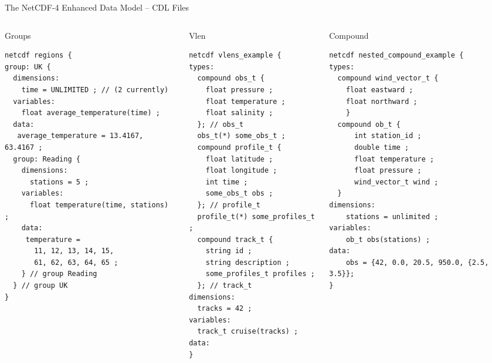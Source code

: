 \documentclass[compress,11pt,xcolor=svgnames,aspectratio=169]{beamer}
\begin{document}
\begin{frame}[fragile]{The NetCDF-4 Enhanced Data Model -- CDL Files}

\begin{columns}

\begin{column}{0.35\textwidth}
\begin{block}{Groups}
\vspace*{-0.4cm}
{ \tiny
\begin{verbatim}
netcdf regions {
group: UK {
  dimensions:
    time = UNLIMITED ; // (2 currently)
  variables:
    float average_temperature(time) ;
  data:
   average_temperature = 13.4167, 63.4167 ;
  group: Reading {
    dimensions:
      stations = 5 ;
    variables:
      float temperature(time, stations) ;
    data:
     temperature =
       11, 12, 13, 14, 15,
       61, 62, 63, 64, 65 ;
    } // group Reading
  } // group UK
}
\end{verbatim}
}
\vspace*{-0.4cm}
\end{block}
\end{column}

\begin{column}{0.25\textwidth}
\begin{block}{Vlen}
\vspace*{-0.4cm}
{ \tiny
\begin{verbatim}
netcdf vlens_example {
types:
  compound obs_t {
    float pressure ;
    float temperature ;
    float salinity ;
  }; // obs_t
  obs_t(*) some_obs_t ;
  compound profile_t {
    float latitude ;
    float longitude ;
    int time ;
    some_obs_t obs ;
  }; // profile_t
  profile_t(*) some_profiles_t ;
  compound track_t {
    string id ;
    string description ;
    some_profiles_t profiles ;
  }; // track_t
dimensions:
  tracks = 42 ;
variables:
  track_t cruise(tracks) ;
data:
}
\end{verbatim}
}
\end{block}
\end{column}

\begin{column}{0.37\textwidth}
\begin{block}{Compound}
\vspace*{-0.4cm}
{ \tiny
\begin{verbatim}
netcdf nested_compound_example {
types:
  compound wind_vector_t {
    float eastward ;
    float northward ;
    }
  compound ob_t {
      int station_id ;
      double time ;
      float temperature ;
      float pressure ;
      wind_vector_t wind ;
  }
dimensions:
    stations = unlimited ;
variables:
    ob_t obs(stations) ;
data:
    obs = {42, 0.0, 20.5, 950.0, {2.5, 3.5}};
}
\end{verbatim}
}
\vspace*{-0.4cm}
\end{block}
\end{column}

\end{columns}

\end{frame}
\end{document}
